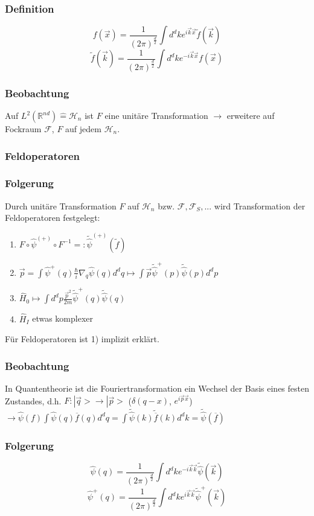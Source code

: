 \documentclass[twoside,a4paper]{scrartcl}
\newcommand{\R}{\mathbb{R}}
\renewcommand{\1}{\mathds{1}}
\newcommand{\ra}{\rightarrow}
\renewcommand{\H}{\mathcal{H}}
\newcommand{\F}{\mathcal{F}}
\renewcommand{\R}{\mathbb{R}}
\begin{document}
\subsubsection*{Definition}
$$f(\vec x)=\frac{1}{(2\pi)^{\frac{d}{2}}}\int d^dk e^{i\vec k\vec x} \tilde f(\vec k)$$
$$\tilde f(\vec k)=\frac{1}{(2\pi)^{\frac{d}{2}}}\int d^dk e^{-i\vec k\vec x} f(\vec x)$$
\subsubsection*{Beobachtung}
Auf $L^2(\R^{nd}) \mathrel{\widehat{=}} \H_n$ ist $F$ eine unitäre Transformation $\ra$ erweitere auf Fockraum $\F$, $F$ auf jedem $\H_n$.
\subsubsection*{Feldoperatoren}
\subsubsection*{Folgerung}
Durch unitäre Transformation $F$ auf $\H_n$ bzw. $\F,\F_S,...$ wird Transformation der Feldoperatoren festgelegt:
\begin{enumerate}
\item $F \circ \hat \psi^{(+)}\circ F^{-1}=:\tilde {\hat \psi}^{(+)}(\tilde f)$
\item $\vec p=\int \hat \psi^+(q) \frac{\hbar}{i} \nabla_q \hat \psi(q)d^dq \mapsto \int \vec p \tilde {\hat \psi}^{+}(p) \tilde {\hat \psi}(p) d^dp $
\item $\hat H_0 \mapsto \int d^dp \frac{\vec p^2}{2m} \tilde {\hat \psi}^{+}(q)\tilde {\hat \psi}(q)$
\item $\hat H_I$ etwas komplexer
\end{enumerate}
Für Feldoperatoren ist 1) implizit erklärt.
\subsubsection*{Beobachtung}
In Quantentheorie ist die Fouriertransformation ein Wechsel der Basis eines festen Zustandes, d.h. $F: |\vec q> \ra |\vec p>$ ($\delta(q-x)$, $e^{i \vec p \vec x}$)\\
$\ra \hat \psi(f)\int \hat \psi(q)\overline{f}(q) d^dq=\int \tilde {\hat \psi}(k) \tilde{\overline{f}}(k)d^dk=\tilde {\hat \psi} (\overline{f}) $
\subsubsection*{Folgerung}
$$\hat \psi(q)=\frac{1}{(2\pi)^{\frac{d}{2}}}\int d^dk e^{-i\vec k\vec k} \tilde {\hat \psi}(\vec k)$$
$$\hat \psi^+(q)=\frac{1}{(2\pi)^{\frac{d}{2}}}\int d^dk e^{i\vec k\vec k} \tilde {\hat \psi}^+(\vec k)$$
\end{document}
